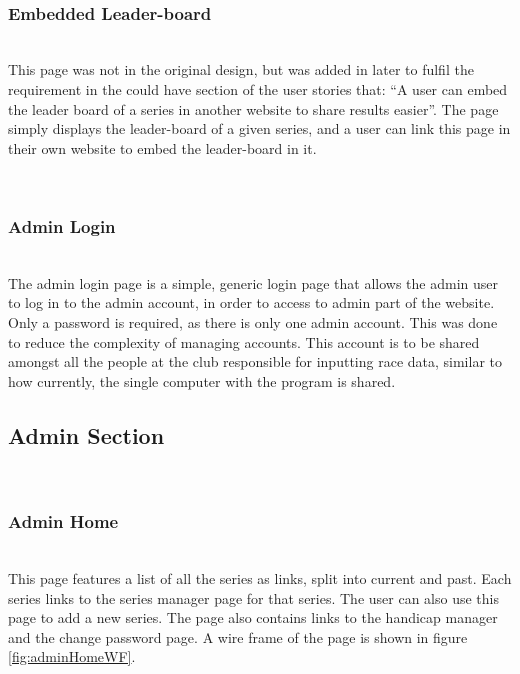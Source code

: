 \documentclass{l4proj}
\begin{document}
\hfill\\
\subsubsection{Embedded Leader-board}
\hfill\\
This page was not in the original design, but was added in later to fulfil the requirement in the could have section of the user stories that: “A user can embed the leader board of a series in another website to share results easier”. The page simply displays the leader-board of a given series, and a user can link this page in their own website to embed the leader-board in it.

\hfill\\
\subsubsection{Admin Login}
\hfill\\
The admin login page is a simple, generic login page that allows the admin user to log in to the admin account, in order to access to admin part of the website. Only a password is required, as there is only one admin account. This was done to reduce the complexity of managing accounts. This account is to be shared amongst all the people at the club responsible for inputting race data, similar to how currently, the single computer with the \citet{sailwave} program is shared.

\subsection{Admin Section}

\hfill\\
\subsubsection{Admin Home}
\hfill\\
This page features a list of all the series as links, split into current and past. Each series links to the series manager page for that series. The user can also use this page to add a new series. The page also contains links to the handicap manager and the change password page. A wire frame of the page is shown in figure \ref{fig:adminHomeWF}.
\end{document}
